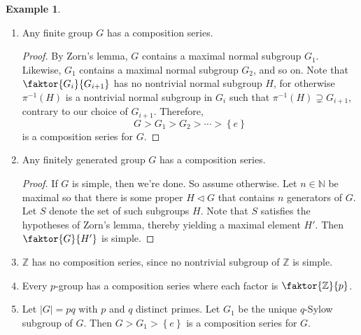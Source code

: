 \documentclass[10pt,letterpaper,cm]{nupset}
\theoremstyle{definition}
\newtheorem{exmp}[definition]{Example}
\theoremstyle{theorem}
\theoremstyle{remark}
\newcommand{\N}{\mathbb N}
\newcommand{\Z}{\mathbb Z}
\newcommand{\1}{\mathbf{1}}
\newcommand{\0}{\vec 0}
\begin{document}
\begin{exmp} $ $
\begin{enumerate}
\item Any finite group $G$ has a composition series.
\begin{proof}
By Zorn's lemma, $G$ contains a maximal normal subgroup $G_1$. Likewise, $G_1$ contains a maximal normal subgroup $G_2$, and so on. Note that $\faktor{G_i}{G_{i+1}}$ has no nontrivial normal subgroup $H$, for otherwise $\pi^{-1}(H)$ is a nontrivial normal subgroup in $G_i$ such that $\pi^{-1}(H) \supsetneq G_{i+1}$, contrary to our choice of $G_{i+1}$.  Therefore,  $$G> G_1 > G_2 > \cdots > \left\{e\right\}$$ is a composition series for $G$.
\end{proof}
\item Any finitely generated group $G$ has a composition series.
\begin{proof}
If $G$ is simple, then we're done. So assume otherwise. Let $n\in \N$ be maximal so that there is some proper $H \lhd G$ that contains $n$ generators of $G$. Let $S$ denote the set of such subgroups $H$. Note that $S$ satisfies the hypotheses of Zorn's lemma, thereby yielding a maximal element $H'$. Then $\faktor{G}{H'}$ is simple. 
\end{proof}
\item $\Z$ has no composition series, since no nontrivial subgroup of $\Z$ is simple.
\item Every $p$-group has a composition series where each factor is $\faktor{\Z}{p}$.
\item Let $\left\lvert{G}\right\rvert= pq$ with $p$ and $q$ distinct primes. Let $G_1$ be the unique $q$-Sylow subgroup of $G$. Then $G > G_1 > \left\{e\right\}$ is a composition series for $G$.
\end{enumerate}
\end{exmp}
\end{document}
